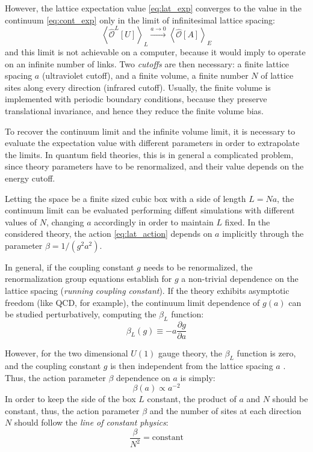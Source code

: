 However, the lattice expectation value \eqref{eq:lat_exp} converges to the value in the continuum \eqref{eq:cont_exp} only in the limit of infinitesimal lattice spacing:
\begin{equation}\label{eq:cont_limit}
    \left<\hat{\mathcal O}^L[U]\right>_L \xrightarrow{a\to0} \left<\hat{\mathcal O}[A]\right>_E
\end{equation}
and this limit is not achievable on a computer, because it would imply to operate on an infinite number of links.
Two \emph{cutoffs} are then necessary: a finite lattice spacing $a$ (ultraviolet cutoff),
and a finite volume, \ie a finite number $N$ of lattice sites along every direction (infrared cutoff).
Usually, the finite volume is implemented with periodic boundary conditions,
because they preserve translational invariance, and hence they reduce the finite volume bias.

To recover the continuum limit and the infinite volume limit,
it is necessary to evaluate the expectation value with different parameters in order to extrapolate the limits.
In quantum field theories, this is in general a complicated problem,
since theory parameters have to be renormalized, and their value depends on the energy cutoff.

Letting the space be a finite sized cubic box with a side of length $L=Na$,
the continuum limit can be evaluated performing diffent simulations with different values of $N$, changing $a$ accordingly in order to maintain $L$ fixed.
In the considered theory, the action \eqref{eq:lat_action} depends on $a$ implicitly through the parameter $\beta = 1/(g^2a^2)$.

In general, if the coupling constant $g$ needs to be renormalized,
the renormalization group equations establish for $g$ a non-trivial dependence on the lattice spacing (\emph{running coupling constant}).
If the theory exhibits asymptotic freedom (like QCD, for example), the continuum limit dependence of $g(a)$ can be studied perturbatively, computing the $\beta_L$ function:
\[
    \beta_L(g) \equiv -a\frac{\partial g}{\partial a}
\]

However, for the two dimensional $U(1)$ gauge theory, the $\beta_L$ function is zero, and the coupling constant $g$ is then independent from the lattice spacing $a$ \cite{casana:1997}.
Thus, the action parameter $\beta$ dependence on $a$ is simply:
\[
    \beta(a) \propto a^{-2}
\]
In order to keep the side of the box $L$ constant, the product of $a$ and $N$ should be constant,
thus, the action parameter $\beta$ and the number of sites at each direction $N$ should follow the \emph{line of constant physics}:
\begin{equation}\label{eq:const_phys}
    \frac{\beta}{N^2} = \text{constant}
\end{equation}

